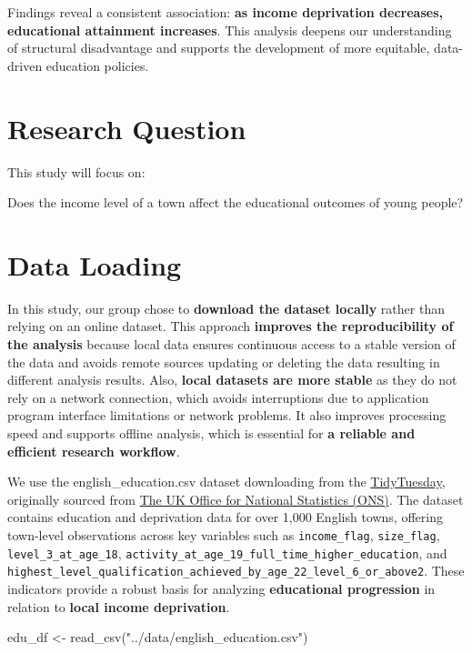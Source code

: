 \documentclass[11pt,en]{../tex/elegantpaper}
\newenvironment{Shaded}{\begin{snugshade}}{\end{snugshade}}
\newcommand{\FunctionTok}[1]{\textcolor[rgb]{0.00,0.00,0.81}{#1}}
\newcommand{\NormalTok}[1]{#1}
\newcommand{\OtherTok}[1]{\textcolor[rgb]{0.50,0.00,0.50}{#1}}
\newcommand{\StringTok}[1]{\textcolor[rgb]{0.31,0.60,0.02}{#1}}
\begin{document}
Findings reveal a consistent association: \textbf{as income deprivation
decreases, educational attainment increases}. This analysis deepens our
understanding of structural disadvantage and supports the development of
more equitable, data-driven education policies.

\section{Research Question}\label{research-question}

This study will focus on:

Does the income level of a town affect the educational outcomes of young
people?

\section{Data Loading}\label{data-loading}

In this study, our group chose to \textbf{download the dataset locally}
rather than relying on an online dataset. This approach \textbf{improves
the reproducibility of the analysis} because local data ensures
continuous access to a stable version of the data and avoids remote
sources updating or deleting the data resulting in different analysis
results. Also, \textbf{local datasets are more stable} as they do not
rely on a network connection, which avoids interruptions due to
application program interface limitations or network problems. It also
improves processing speed and supports offline analysis, which is
essential for \textbf{a reliable and efficient research workflow}.

We use the english\_education.csv dataset downloading from the
\href{https://github.com/rfordatascience/tidytuesday/blob/main/data/2024/2024-01-23/english_education.csv}{TidyTuesday},
originally sourced from \href{https://www.ons.gov.uk/}{The UK Office for
National Statistics (ONS)}. The dataset contains education and
deprivation data for over 1,000 English towns, offering town-level
observations across key variables such as \texttt{income\_flag},
\texttt{size\_flag}, \texttt{level\_3\_at\_age\_18},
\texttt{activity\_at\_age\_19\_full\_time\_higher\_education}, and
\texttt{highest\_level\_qualification\_achieved\_by\_age\_22\_level\_6\_or\_above2}.
These indicators provide a robust basis for analyzing
\textbf{educational progression} in relation to \textbf{local income
deprivation}.

\begin{Shaded}
\begin{Highlighting}[]
\NormalTok{edu\_df }\OtherTok{\textless{}{-}} \FunctionTok{read\_csv}\NormalTok{(}\StringTok{"../data/english\_education.csv"}\NormalTok{)}
\end{Highlighting}
\end{Shaded}
\end{document}
